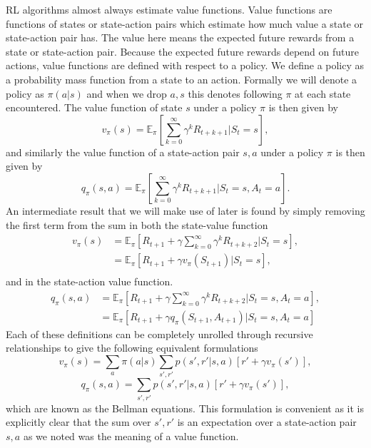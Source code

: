 \documentclass{article}
\newcommand{\mb}{\mathbb}
\begin{document}
RL algorithms almost always estimate value functions. Value functions are functions of states or state-action pairs which estimate how much value a state or state-action pair has. The value here means the expected future rewards from a state or state-action pair. Because the expected future rewards depend on future actions, value functions are defined with respect to a policy. We define a policy as a probability mass function from a state to an action. Formally we will denote a policy as $\pi(a|s)$ and when we drop $a, s$ this denotes following $\pi$ at each state encountered. The value function of state $s$ under a policy $\pi$ is then given by
\begin{equation}
v_\pi(s) = \mb{E}_\pi[\sum_{k=0}^\infty \gamma^k R_{t+k+1}|S_t=s],
\end{equation}
and similarly the value function of a state-action pair $s, a$ under a policy $\pi$ is then given by
\begin{equation}
q_\pi(s, a) = \mb{E}_\pi[\sum_{k=0}^\infty \gamma^k R_{t+k+1}|S_t=s, A_t=a].
\end{equation}
An intermediate result that we will make use of later is found by simply removing the first term from the sum in both the state-value function 
\begin{equation}\label{eq:inter_v}
\begin{split}
v_\pi(s) &= \mb{E}_\pi[R_{t+1} + \gamma\sum_{k=0}^\infty \gamma^k R_{t+k+2}|S_t=s], \\
&= \mb{E}_\pi[R_{t+1} + \gamma v_\pi(S_{t+1})|S_t=s], \\
\end{split}
\end{equation}
and in the state-action value function.
\begin{equation}\label{eq:inter_q}
\begin{split}
q_\pi(s, a) &= \mb{E}_\pi[R_{t+1} + \gamma\sum_{k=0}^\infty \gamma^k R_{t+k+2}|S_t=s, A_t=a], \\
&= \mb{E}_\pi[R_{t+1} + \gamma q_\pi(S_{t+1}, A_{t+1})|S_t=s, A_t=a]
\end{split}
\end{equation}
Each of these definitions can be completely unrolled through recursive relationships to give the following equivalent formulations
\begin{equation}\label{eq:evaluation}
v_\pi(s) = \sum_a \pi(a|s)\sum_{s',r'}p(s', r'|s, a)[r' + \gamma v_\pi(s')],
\end{equation}
\begin{equation}
q_\pi(s, a) = \sum_{s',r'}p(s', r'|s, a)[r' + \gamma v_\pi(s')],
\end{equation}
which are known as the Bellman equations. This formulation is convenient as it is explicitly clear that the sum over $s', r'$ is an expectation over a state-action pair $s, a$ as we noted was the meaning of a value function.
\end{document}
